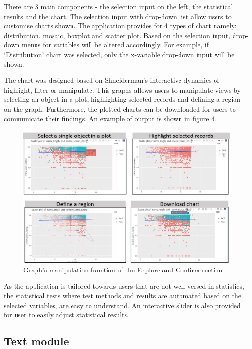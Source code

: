 \documentclass{acm_proc_article-sp}
\begin{document}
There are 3 main components - the selection input on the left, the
statistical results and the chart. The selection input with drop-down
list allow users to customise charts shown. The application provides for
4 types of chart namely: distribution, mosaic, boxplot and scatter plot.
Based on the selection input, drop-down menus for variables will be
altered accordingly. For example, if `Distribution' chart was selected,
only the x-variable drop-down input will be shown.

The chart was designed based on Shneiderman's interactive dynamics of
highlight, filter or manipulate. This graphs allows users to manipulate
views by selecting an object in a plot, highlighting selected records
and defining a region on the graph. Furthermore, the plotted charts can
be downloaded for users to communicate their findings. An example of
output is shown in figure 4.

\begin{figure}[H]

{\centering \includegraphics[width=1\linewidth]{images/design_explore2} 

}

\caption{Graph's manipulation function of the Explore and Confirm section}\label{fig:unnamed-chunk-4}
\end{figure}

As the application is tailored towards users that are not well-versed in
statistics, the statistical tests where test methods and results are
automated based on the selected variables, are easy to understand. An
interactive slider is also provided for user to easily adjust
statistical results.

\hypertarget{text-module}{%
\subsection{Text module}\label{text-module}}
\end{document}
